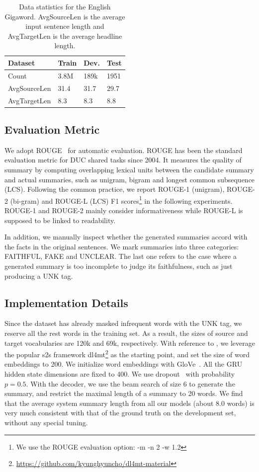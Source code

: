 \documentclass[letterpaper]{article} %
\begin{document}
	\begin{table}[]
		\centering
		\begin{tabular}{l|lll}
			\hline
			Dataset      & Train & Dev. & Test \\ \hline
			Count        & 3.8M  & 189k & 1951 \\
			AvgSourceLen & 31.4  & 31.7 & 29.7     \\
			AvgTargetLen & 8.3   & 8.3  & 8.8     \\ \hline
		\end{tabular}
		\caption{Data statistics for the English Gigaword. AvgSourceLen is the average input sentence length and AvgTargetLen is the average headline length.}
		\label{tb:dataset}
	\end{table}
	
	
	\subsection{Evaluation Metric}
	We adopt ROUGE~\cite{lin2004rouge} for automatic evaluation.
	ROUGE has been the standard evaluation metric for DUC shared tasks since 2004. 
	It measures the quality of summary by computing overlapping lexical units between the candidate summary and actual summaries, such as unigram, bigram and longest common subsequence (LCS). 
	Following the common practice, we report ROUGE-1 (unigram), ROUGE-2 (bi-gram) and ROUGE-L (LCS) F1 scores\footnote{We use the ROUGE evaluation option: -m -n 2 -w 1.2} in the following experiments.
	ROUGE-1 and ROUGE-2 mainly consider informativeness while ROUGE-L is supposed to be linked to readability.
	
	In addition, we manually inspect whether the generated summaries accord with the facts in the original sentences.
	We mark summaries into three categories: FAITHFUL, FAKE and UNCLEAR.
	The last one refers to the case where a generated summary is too incomplete to judge its faithfulness, such as just producing a UNK tag.
	
	\subsection{Implementation Details}
	Since the dataset has already masked infrequent words with the UNK tag, we reserve all the rest words in the training set.
	As a result, the sizes of source and target vocabularies are 120k and 69k, respectively. 
	With reference to \cite{nallapati2016abstractive}, we leverage the popular s2s framework dl4mt\footnote{\url{https://github.com/kyunghyuncho/dl4mt-material}} as the starting point, and set the size of word embeddings to 200.
	We initialize word embeddings with GloVe~\cite{pennington2014glove}.
	All the GRU hidden state dimensions are fixed to 400.
	We use dropout~\cite{srivastava2014dropout} with probability $p = 0.5$.
	With the decoder, we use the beam search of size 6 to generate the summary, and restrict the maximal length of a summary to 20 words.
	We find that the average system summary length from all our models (about 8.0 words) is very much consistent with that of the ground truth on the development set, without any special tuning. 
	
\end{document}
